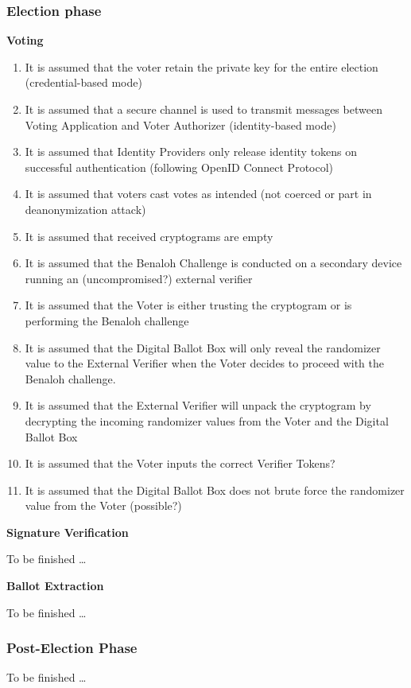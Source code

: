 \subsubsection{Election phase} 

\textbf{Voting}

\begin{enumerate}
\item It is assumed that the voter retain the private key for the entire election (credential-based mode)
\item It is assumed that a secure channel is used to transmit messages between Voting Application and Voter Authorizer (identity-based mode)
\item It is assumed that Identity Providers only release identity tokens on successful authentication (following OpenID Connect Protocol)
\item It is assumed that voters cast votes as intended (not coerced or part in deanonymization attack)
\item It is assumed that received cryptograms are empty
\item It is assumed that the Benaloh Challenge is conducted on a secondary device running an (uncompromised?) external verifier
\item It is assumed that the Voter is either trusting the cryptogram or is performing the Benaloh challenge
\item It is assumed that the Digital Ballot Box will only reveal the randomizer value to the External Verifier when the Voter decides to proceed with the Benaloh challenge.
\item It is assumed that the External Verifier will unpack the cryptogram by decrypting the incoming randomizer values from the Voter and the Digital Ballot Box
\item It is assumed that the Voter inputs the correct Verifier Tokens?
\item It is assumed that the Digital Ballot Box does not brute force the randomizer value from the Voter (possible?)
\end{enumerate}

\textbf{Signature Verification}

To be finished …

\textbf{Ballot Extraction}

To be finished …


\subsubsection{Post-Election Phase} 
To be finished …
